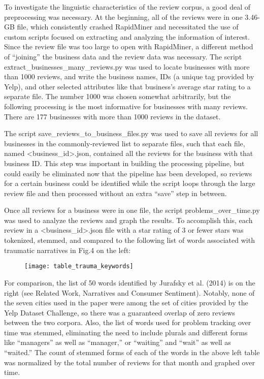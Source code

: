 \quad To investigate the linguistic characteristics of the review corpus, a good deal of preprocessing was necessary. At the beginning, all of the reviews were in one 3.46-GB file, which consistently crashed RapidMiner and necessitated the use of custom scripts focused on extracting and analyzing the information of interest. Since the review file was too large to open with RapidMiner, a different method of “joining” the business data and the review data was necessary. The script extract_businesses_many_reviews.py was used to locate businesses with more than 1000 reviews, and write the business names, IDs (a unique tag provided by Yelp), and other selected attributes like that business’s average star rating to a separate file. The number 1000 was chosen somewhat arbitrarily, but the following processing is the most informative for businesses with many reviews. There are 177 businesses with more than 1000 reviews in the dataset.

\quad The script save_reviews_to_business_files.py was used to save all reviews for all businesses in the commonly-reviewed list to separate files, such that each file, named <business_id>.json, contained all the reviews for the business with that business ID. This step was important in building the processing pipeline, but could easily be eliminated now that the pipeline has been developed, so reviews for a certain business could be identified while the script loops through the large review file and then processed without an extra “save” step in between.

\quad Once all reviews for a business were in one file, the script problems_over_time.py was used to analyze the reviews and graph the results. To accomplish this, each review in a <business_id>.json file with a star rating of 3 or fewer stars was tokenized, stemmed, and compared to the following list of words associated with traumatic narratives in Fig.4 on the left:

\begin{figure}[h]
\texttt{[image: table\_trauma\_keywords]}
\end{figure}

\quad For comparison, the list of 50 words identified by Jurafsky et al. (2014) is on the right (see Related Work, Narratives and Consumer Sentiment). Notably, none of the seven cities used in the paper were among the set of cities provided by the Yelp Dataset Challenge, so there was a guaranteed overlap of zero reviews between the two corpora. Also, the list of words used for problem tracking over time was stemmed, eliminating the need to include plurals and different forms like “managers” as well as “manager,” or “waiting” and “wait” as well as “waited.” The count of stemmed forms of each of the words in the above left table was normalized by the total number of reviews for that month and graphed over time.

